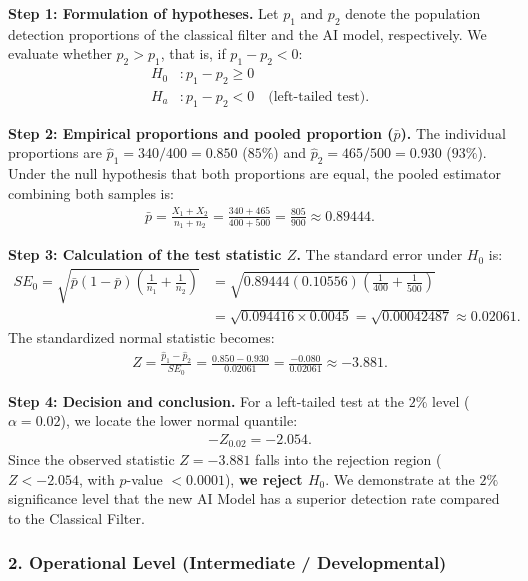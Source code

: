 \begin{solucion}
	\textbf{Step 1: Formulation of hypotheses.}
	Let $p_1$ and $p_2$ denote the population detection proportions of the classical filter and the AI model, respectively. We evaluate whether $p_2 > p_1$, that is, if $p_1 - p_2 < 0$:
	\begin{align}
		H_0&: p_1 - p_2 \geq 0 \\
		H_a&: p_1 - p_2 < 0 \quad \text{(left-tailed test)}.
	\end{align}
	
	\textbf{Step 2: Empirical proportions and pooled proportion ($\bar{p}$).}
	The individual proportions are $\hat{p}_1 = 340/400 = 0.850$ ($85\%$) and $\hat{p}_2 = 465/500 = 0.930$ ($93\%$).
	Under the null hypothesis that both proportions are equal, the pooled estimator combining both samples is:
	\begin{align}
		\bar{p} = \frac{X_1 + X_2}{n_1 + n_2} = \frac{340 + 465}{400 + 500} = \frac{805}{900} \approx 0.89444.
	\end{align}
	
	\textbf{Step 3: Calculation of the test statistic $Z$.}
	The standard error under $H_0$ is:
	\begin{align}
		SE_0 = \sqrt{\bar{p}(1-\bar{p})\left(\frac{1}{n_1} + \frac{1}{n_2}\right)} &= \sqrt{0.89444(0.10556)\left(\frac{1}{400} + \frac{1}{500}\right)} \\
		&= \sqrt{0.094416 \times 0.0045} = \sqrt{0.00042487} \approx 0.02061.
	\end{align}
	The standardized normal statistic becomes:
	\begin{align}
		Z = \frac{\hat{p}_1 - \hat{p}_2}{SE_0} = \frac{0.850 - 0.930}{0.02061} = \frac{-0.080}{0.02061} \approx -3.881.
	\end{align}
	
	\textbf{Step 4: Decision and conclusion.}
	For a left-tailed test at the $2\%$ level ($\alpha = 0.02$), we locate the lower normal quantile:
	\begin{align}
		-Z_{0.02} = -2.054.
	\end{align}
	Since the observed statistic $Z = -3.881$ falls into the rejection region ($Z < -2.054$, with $p$-value $< 0.0001$), \textbf{we reject $H_0$}. We demonstrate at the $2\%$ significance level that the new AI Model has a superior detection rate compared to the Classical Filter.
\end{solucion}

\subsubsection*{2. Operational Level (Intermediate / Developmental)}

